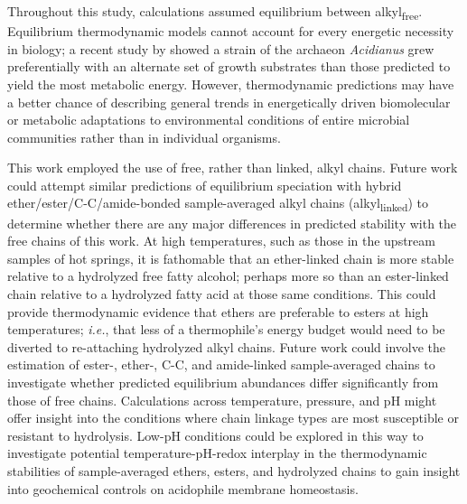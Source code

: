 Throughout this study, calculations assumed equilibrium between alkyl\textsubscript{free}. Equilibrium thermodynamic models cannot account for every energetic necessity in biology; a recent study by \cite{amenabar2017microbial} showed a strain of the archaeon \textit{Acidianus} grew preferentially with an alternate set of growth substrates than those predicted to yield the most metabolic energy. However, thermodynamic predictions may have a better chance of describing general trends in energetically driven biomolecular or metabolic adaptations to environmental conditions of entire microbial communities rather than in individual organisms.

This work employed the use of free, rather than linked, alkyl chains. Future work could attempt similar predictions of equilibrium speciation with hybrid ether/ester/C-C/amide-bonded sample-averaged alkyl chains (alkyl\textsubscript{linked}) to determine whether there are any major differences in predicted stability with the free chains of this work. At high temperatures, such as those in the upstream samples of hot springs, it is fathomable that an ether-linked chain is more stable relative to a hydrolyzed free fatty alcohol; perhaps more so than an ester-linked chain relative to a hydrolyzed fatty acid at those same conditions. This could provide thermodynamic evidence that ethers are preferable to esters at high temperatures; \textit{i.e.}, that less of a thermophile's energy budget would need to be diverted to re-attaching hydrolyzed alkyl chains. Future work could involve the estimation of ester-, ether-, C-C, and amide-linked sample-averaged chains to investigate whether predicted equilibrium abundances differ significantly from those of free chains. Calculations across temperature, pressure, and pH might offer insight into the conditions where chain linkage types are most susceptible or resistant to hydrolysis. Low-pH conditions could be explored in this way to investigate potential temperature-pH-redox interplay in the thermodynamic stabilities of sample-averaged ethers, esters, and hydrolyzed chains to gain insight into geochemical controls on acidophile membrane homeostasis.

